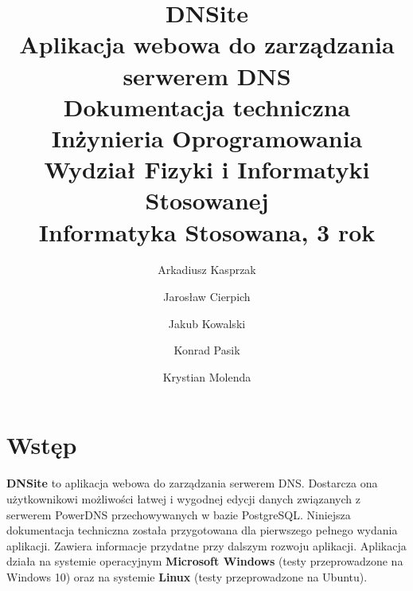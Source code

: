 \documentclass[11pt]{article}
\title 
{	
	{
		\textbf{\textsf{\Huge\color{orange}DNS\color{white}ite}} \\ [0.1in]
		\normalfont\sffamily\LARGE\color{white}
		Aplikacja webowa do zarządzania serwerem DNS \\[0.1in]
		Dokumentacja techniczna\\ [1.5in]
		\large 
		Inżynieria Oprogramowania \\
		Wydział Fizyki i Informatyki Stosowanej \\
		Informatyka Stosowana, 3 rok \\
	}
}
\author 
{
	\color{white}\normalfont\sffamily Arkadiusz Kasprzak \and 
	\color{white}\normalfont\sffamily Jarosław Cierpich \and 
	\color{white}\normalfont\sffamily Jakub Kowalski \and 
	\color{white}\normalfont\sffamily Konrad Pasik \and 
	\color{white}\normalfont\sffamily Krystian Molenda
}
\date{}
\begin{document}
\pagecolor{backgroundColor}
\maketitle
\thispagestyle{empty}


\newpage
\clearpage
{}
\pagecolor{white}

\tableofcontents

\newpage 

\section{Wstęp}
\textbf{DNSite} to aplikacja webowa do zarządzania serwerem DNS. Dostarcza ona użytkownikowi możliwości łatwej i wygodnej edycji danych związanych z serwerem PowerDNS przechowywanych w bazie PostgreSQL.\newline
Niniejsza dokumentacja techniczna została przygotowana dla pierwszego pełnego wydania aplikacji. Zawiera informacje przydatne przy dalszym rozwoju aplikacji. \newline
Aplikacja działa na systemie operacyjnym \textbf{Microsoft Windows} (testy przeprowadzone na Windows 10) oraz na systemie \textbf{Linux} (testy przeprowadzone na Ubuntu).
\end{document}
